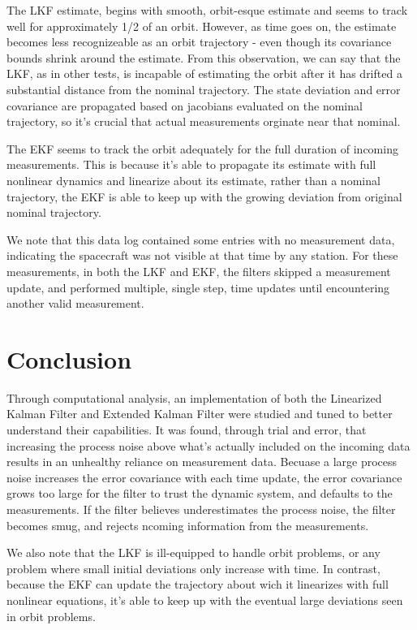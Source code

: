 \documentclass[11pt, a4paper]{article}
\begin{document}
The LKF estimate, begins with smooth, orbit-esque estimate and seems to track well for approximately 1/2 of an orbit. 
However, as time goes on, the estimate becomes less recognizeable as an orbit trajectory - even though its covariance bounds shrink around the estimate.
From this observation, we can say that the LKF, as in other tests, is incapable of estimating the orbit after it has drifted a substantial distance from the nominal trajectory. 
The state deviation and error covariance are propagated based on jacobians evaluated on the nominal trajectory, so it's crucial that actual measurements orginate near that nominal. 

The EKF seems to track the orbit adequately for the full duration of incoming measurements. 
This is because it's able to propagate its estimate with full nonlinear dynamics and linearize about its estimate, rather than a nominal trajectory, 
the EKF is able to keep up with the growing deviation from original nominal trajectory. 

We note that this data log contained some entries with no measurement data, indicating the spacecraft was not visible at that time by any station. 
For these measurements, in both the LKF and EKF, the filters skipped a measurement update, and performed multiple, single step, time updates until encountering another valid measurement.  

\section{Conclusion}
Through computational analysis, an implementation of both the Linearized Kalman Filter and Extended Kalman Filter were studied and tuned to better understand their capabilities. 
It was found, through trial and error, that increasing the process noise above what's actually included on the incoming data results in an unhealthy reliance on measurement data. 
Becuase a large process noise increases the error covariance with each time update, the error covariance grows too large for the filter to trust the dynamic system, and defaults to the measurements. 
If the filter believes underestimates the process noise, the filter becomes smug, and rejects ncoming information from the measurements. 

We also note that the LKF is ill-equipped to handle orbit problems, or any problem where small initial deviations only increase with time.
In contrast, because the EKF can update the trajectory about wich it linearizes with full nonlinear equations, it's able to keep up with the eventual large deviations seen in orbit problems.  
\end{document}
